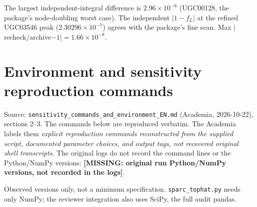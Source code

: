 \documentclass[10pt,a4paper]{article}
\newcommand{\missing}[1]{\textcolor{red!70!black}{\textbf{[MISSING: #1]}}}
\begin{document}
The largest independent-integral difference is $2.96\times10^{-6}$ (UGC00128, the package's node-doubling worst case). The independent $|1-f_L|$ at the refined UGC03546 peak ($2.30296\times10^{-7}$) agrees with the package's fine scan. Max $|$recheck/archive$-1|=1.66\times10^{-8}$.

\section{\texorpdfstring{Environment and sensitivity reproduction commands}{Environment and sensitivity reproduction commands}}\label{sec:env}
Source: \texttt{sensitivity\_commands\_and\_environment\_EN.md} (Academia, 2026-10-22), sections 2--3. The commands below are reproduced verbatim. The Academia labels them \emph{explicit reproduction commands reconstructed from the supplied script, documented parameter choices, and output tags, not recovered original shell transcripts}. The original logs do not record the command lines or the Python/NumPy versions: \missing{original run Python/NumPy versions, not recorded in the logs}.


\noindent Observed versions only, not a minimum specification. \texttt{sparc\_tophat.py} needs only NumPy; the reviewer integration also uses SciPy, the full audit pandas.
\end{document}
